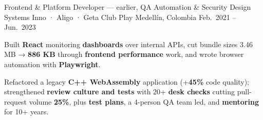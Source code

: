 \begin{cventries}
  \cventry
  {Frontend \& Platform Developer --- earlier, QA Automation \& Security}
  {Design Systems Inno · Aligo · Geta Club Play}
  {Medellín, Colombia}
  {Feb.\ 2021 -- Jun.\ 2023}
  {
    \begin{cvitems}
      \item {Built \textbf{React} monitoring \textbf{dashboards} over internal APIs, cut bundle sizes 3.46 MB → \textbf{886 KB} through \textbf{frontend performance} work, and wrote browser automation with \textbf{Playwright}.}
      \item {Refactored a legacy \textbf{C++ WebAssembly} application (+\textbf{45\%} code quality); strengthened \textbf{review culture and tests} with 20+ \textbf{desk checks} cutting pull-request volume \textbf{25\%}, plus \textbf{test plans}, a 4-person QA team led, and \textbf{mentoring} for 10+ years.}
    \end{cvitems}
  }

\end{cventries}
